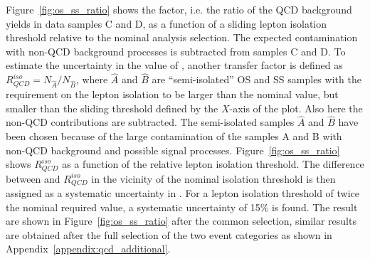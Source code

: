 Figure~\ref{fig:os_ss_ratio} shows the \rqcd factor, i.e. the ratio of the QCD background 
yields in data samples C and D, as a function of a sliding lepton isolation threshold relative to the 
nominal analysis selection.
The expected contamination with  non-QCD background processes is subtracted from  samples C and D.
To estimate the uncertainty in the value of \rqcd,  another transfer factor is defined as $R_{QCD}^{iso}  = N_{\hat{A}} / N_{\hat{B}}$,
where  $\hat{A}$ and $\hat{B}$  are ``semi-isolated'' OS and SS samples with  the requirement on  the lepton isolation to be  larger 
than the nominal value, 
but smaller than the sliding threshold defined by the $X$-axis of the plot. Also here the non-QCD contributions are subtracted.
The semi-isolated samples $\hat{A}$ and $\hat{B}$ have been chosen  
because of the large contamination of the samples A and B with non-QCD background and  possible signal processes. 
Figure~\ref{fig:os_ss_ratio} shows $R_{QCD}^{iso}$ as a function of the relative lepton isolation threshold.
The difference between \rqcd and $R_{QCD}^{iso} $ in the vicinity of the nominal isolation threshold
is then assigned as a systematic uncertainty in \rqcd. For a lepton isolation threshold of 
twice the nominal required value, a systematic uncertainty of 15\% is found.
The result are shown  in Figure~\ref{fig:os_ss_ratio} after the common selection, similar results are obtained after the full 
selection of the two event categories as shown in Appendix~\ref{appendix:qcd_additional}.

